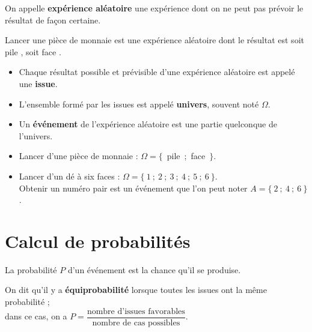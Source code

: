 \begin{definition}
   On appelle \textbf{expérience aléatoire} une expérience dont on ne peut pas prévoir le résultat de façon certaine.
\end{definition}

\begin{exemple*1}
   Lancer une pièce de monnaie est une expérience aléatoire dont le résultat est soit \og pile \fg, soit \og face \fg.
\end{exemple*1}

\begin{vocabulaire}
   \begin{itemize}
      \item Chaque résultat possible et prévisible d'une expérience aléatoire est appelé une \textbf{issue}.
      \item L'ensemble formé par les issues est appelé \textbf{univers}, souvent noté $\Omega$.
      \item Un \textbf{événement} de l'expérience aléatoire est une partie quelconque de l'univers.
   \end{itemize}
\end{vocabulaire}

\begin{exemple*1}
   \begin{itemize}
      \item Lancer d'une pièce de monnaie : $\Omega =\{$~pile~;~face~$\}$.
      \item Lancer d'un dé à six faces : $\Omega =\{~1~;~2~;~3~;~4~;~5~;~6~\}$. \\
      \og Obtenir un numéro pair \fg{} est un événement que l'on peut noter $A=\{~2~;~4~;~6~\}$.
   \end{itemize}
   \vspace*{-5mm}
\end{exemple*1}


\section{Calcul de probabilités} %

La probabilité $P$ d'un événement est \og la chance \fg{} qu'il se produise.

\begin{definition}
   On dit qu'il y a \textbf{équiprobabilité} lorsque toutes les issues ont la même probabilité ; \\ [0.5mm]
   dans ce cas, on a $P=\dfrac{\textrm{nombre d'issues favorables}}{\textrm{nombre de cas possibles}}$.
\end{definition}

